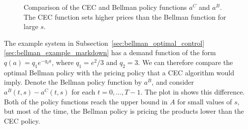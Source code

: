 \documentclass[main.tex]{subfiles}
\begin{document}
\begin{figure}[htbp]
  \caption{Comparison of the CEC and Bellman policy functions $a^C$ and
    $a^B$.
    The CEC function sets
    higher prices than the Bellman function for large $s$.
  }\label{fig:bellman_det_policy_difference}
\end{figure}

The example system in Subsection~\ref{sec:bellman_optimal_control}\ref{sec:bellman_example_markdown} has a demand
function of the form $q(a)=q_1e^{-q_2a}$, where $q_1=e^2/3$ and
$q_2=3$. We can therefore compare the optimal Bellman policy with the
pricing policy that a CEC algorithm would imply.
Denote the Bellman policy function by $a^B$, and consider
$a^B(t,s)-a^C(t,s)$ for each $t=0,\dots,T-1$. The plot in
 shows this difference.
Both of the policy functions reach the upper bound in $A$ for small values
of $s$, but most of the time, the Bellman policy is pricing the products
lower than the CEC policy.
\end{document}
